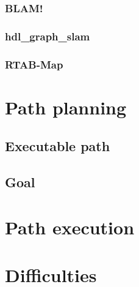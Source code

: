 \documentclass[12pt, a4paper]{report}
\begin{document}
        \subsubsection{BLAM!}
        
        \subsubsection{hdl\_graph\_slam}
        
        \subsubsection{RTAB-Map}
        
        \newpage
    \section{Path planning}
    
      \subsection{Executable path}
      
      \subsection{Goal}
      
      \newpage
    \section{Path execution}
    
    \newpage
    \section{Difficulties}
    

  \printbibliography[heading=none]

\end{document}
